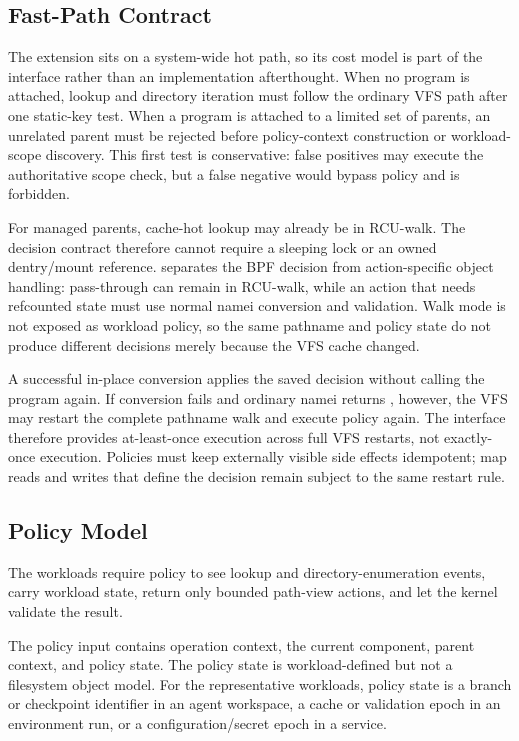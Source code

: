 \subsection{Fast-Path Contract}

The extension sits on a system-wide hot path, so its cost model is part of the
interface rather than an implementation afterthought. When no program is
attached, lookup and directory iteration must follow the ordinary VFS path
after one static-key test. When a program is attached to a limited set of
parents, an unrelated parent must be rejected before policy-context
construction or workload-scope discovery. This first test is conservative:
false positives may execute the authoritative scope check, but a false
negative would bypass policy and is forbidden.

For managed parents, cache-hot lookup may already be in RCU-walk. The decision
contract therefore cannot require a sleeping lock or an owned dentry/mount
reference. \namei separates the BPF decision from action-specific object
handling: pass-through can remain in RCU-walk, while an action that needs
refcounted state must use normal namei conversion and validation. Walk mode is
not exposed as workload policy, so the same pathname and policy state do not
produce different decisions merely because the VFS cache changed.

A successful in-place conversion applies the saved decision without calling
the program again. If conversion fails and ordinary namei returns
, however, the VFS may restart the complete pathname walk and
execute policy again. The interface therefore provides at-least-once execution
across full VFS restarts, not exactly-once execution. Policies must keep
externally visible side effects idempotent; map reads and writes that define the
decision remain subject to the same restart rule.

\subsection{Policy Model}

The workloads require policy to see lookup and directory-enumeration events,
carry workload state, return only bounded path-view actions, and let the kernel
validate the result.

The policy input contains operation context, the current component, parent
context, and policy state. The policy state is workload-defined but not a
filesystem object model. For the representative workloads, policy state is a
branch or checkpoint identifier in an agent workspace, a cache or validation
epoch in an environment run, or a configuration/secret epoch in a service.

